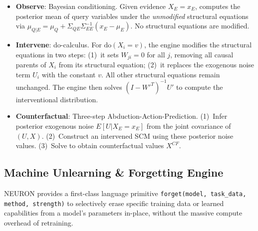 \documentclass[11pt,a4paper]{article}
\begin{document}
\begin{itemize}[itemsep=2pt]
  \item \textbf{Observe}: Bayesian conditioning. Given evidence $X_E = x_E$, computes the posterior mean of query variables under the \emph{unmodified} structural equations via $\mu_{Q|E} = \mu_Q + \Sigma_{QE}\Sigma_{EE}^{-1}(x_E - \mu_E)$. No structural equations are modified.
  \item \textbf{Intervene}: do-calculus. For $\text{do}(X_i = v)$, the engine modifies the structural equations in two steps: (1)~it sets $W_{ji} = 0$ for all $j$, removing all causal parents of $X_i$ from its structural equation; (2)~it replaces the exogenous noise term $U_i$ with the constant $v$. All other structural equations remain unchanged. The engine then solves $(I - W'^T)^{-1}U'$ to compute the interventional distribution.
  \item \textbf{Counterfactual}: Three-step Abduction-Action-Prediction. (1)~Infer posterior exogenous noise $E[U | X_E = x_E]$ from the joint covariance of $(U, X)$. (2)~Construct an intervened SCM using these posterior noise values. (3)~Solve to obtain counterfactual values $X^{CF}$.
\end{itemize}

\subsection{Machine Unlearning \& Forgetting Engine}

NEURON provides a first-class language primitive \texttt{forget(model, task\_data, method, strength)} to selectively erase specific training data or learned capabilities from a model's parameters in-place, without the massive compute overhead of retraining.
\end{document}
